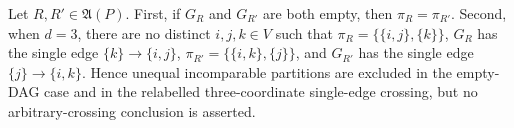 Let \(R,R'\in\mathfrak A(P)\). First, if \(G_R\) and \(G_{R'}\) are both empty, then \(\pi_R=\pi_{R'}\). Second, when \(d=3\), there are no distinct \(i,j,k\in V\) such that \(\pi_R=\{\{i,j\},\{k\}\}\), \(G_R\) has the single edge \(\{k\}\to\{i,j\}\), \(\pi_{R'}=\{\{i,k\},\{j\}\}\), and \(G_{R'}\) has the single edge \(\{j\}\to\{i,k\}\). Hence unequal incomparable partitions are excluded in the empty-DAG case and in the relabelled three-coordinate single-edge crossing, but no arbitrary-crossing conclusion is asserted.